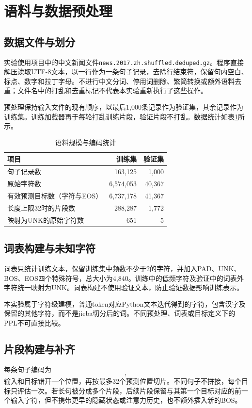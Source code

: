﻿\documentclass[UTF8,a4paper,12pt]{ctexart}
\begin{document}
\section{语料与数据预处理}
\subsection{数据文件与划分}
实验使用项目中的中文新闻文件\nolinkurl{news.2017.zh.shuffled.deduped.gz}。程序直接解压读取UTF-8文本，以一行作为一条句子记录，去除行结束符，保留句内空白、标点、数字和拉丁字母。不进行中文分词、停用词删除、繁简转换或额外语料去重；文件名中的打乱和去重标记不代表本实验重新执行了这些操作。

预处理保持输入文件的现有顺序，以最后1,000条记录作为验证集，其余记录作为训练集。训练加载器再于每轮打乱训练片段，验证片段不打乱。数据统计如表\ref{tab:data}所示。

\begin{table}[H]
\centering
\caption{语料规模与编码统计}
\label{tab:data}
\begin{tabular}{lrr}
\toprule
项目 & 训练集 & 验证集\\
\midrule
句子记录数 & 163,125 & 1,000\\
原始字符数 & 6,574,053 & 40,367\\
有效预测目标数（字符与EOS） & 6,737,178 & 41,367\\
长度上限32时的片段数 & 288,287 & 1,772\\
映射为UNK的原始字符数 & 651 & 5\\
\bottomrule
\end{tabular}
\end{table}

\subsection{词表构建与未知字符}
词表只统计训练文本，保留训练集中频数不少于2的字符，并加入PAD、UNK、BOS、EOS四个特殊符号，总大小为4,840。训练中的低频字符及验证中的词表外字符统一映射为UNK。词表构建不使用验证文本，防止验证数据影响训练表示。

本实验属于字符级建模，普通token对应Python文本迭代得到的字符，包含汉字及保留的其他字符，而不是jieba切分后的词。不同预处理、词表或目标定义下的PPL不可直接比较。

\subsection{片段构建与补齐}
每条句子编码为
\begin{equation}
 [\mathrm{BOS},x_1,\ldots,x_T,\mathrm{EOS}],
\end{equation}
输入和目标错开一个位置，再按最多32个预测位置切片。不同句子不拼接，每个目标只评估一次。若长句被分成多个片段，后续片段保留与其第一个目标对应的前一个输入字符，但不携带更早的隐藏状态或注意力历史，也不额外插入新的BOS。
\end{document}

